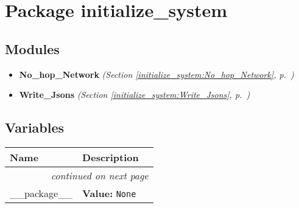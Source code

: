 %
%
%


\section{Package initialize\_system}

    \label{initialize_system}


\subsection{Modules}

\begin{itemize}
\setlength{\parskip}{0ex}
\item \textbf{No\_hop\_Network}
  \textit{(Section \ref{initialize_system:No_hop_Network}, p.~\pageref{initialize_system:No_hop_Network})}

\item \textbf{Write\_Jsons}
  \textit{(Section \ref{initialize_system:Write_Jsons}, p.~\pageref{initialize_system:Write_Jsons})}

\end{itemize}



  \subsection{Variables}

    \vspace{-1cm}
\hspace{\varindent}\begin{longtable}{|p{\varnamewidth}|p{\vardescrwidth}|l}
\cline{1-2}
\cline{1-2} \centering \textbf{Name} & \centering \textbf{Description}& \\
\cline{1-2}
\endhead\cline{1-2}\multicolumn{3}{r}{\small\textit{continued on next page}}\\\endfoot\cline{1-2}
\endlastfoot\raggedright \_\-\_\-p\-a\-c\-k\-a\-g\-e\-\_\-\_\- & \raggedright \textbf{Value:} 
{\tt None}&\\
\cline{1-2}
\end{longtable}

